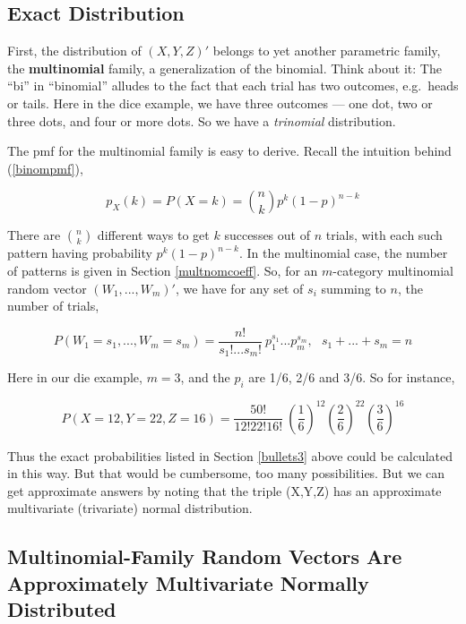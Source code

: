 \subsection{Exact Distribution}

First, the distribution of $(X,Y,Z)'$ belongs to yet another parametric
family, the {\bf multinomial} family, a generalization of the binomial.
Think about it:  The ``bi'' in ``binomial'' alludes to the fact that
each trial has two outcomes, e.g.\ heads or tails.  Here in the dice
example, we have three outcomes --- one dot, two or three dots, and four
or more dots.  So we have a {\it trinomial} distribution.  

The pmf for the multinomial family is easy to derive.  Recall the
intuition behind (\ref{binompmf}),

\begin{equation}
p_X(k) = P(X = k) = \binom{n}{k} p^k (1-p)^{n-k}  
\end{equation}

There are $\binom{n}{k}$ different ways to get $k$ successes out of $n$
trials, with each such pattern having probability $p^k (1-p)^{n-k}$.
In the multinomial case, the number of patterns is given in Section
\ref{multnomcoeff}.  So, for an $m$-category multinomial random vector
$(W_1,...,W_m)'$, we have for any set of $s_i$ summing to $n$, the
number of trials,

\begin{equation}
P(W_1=s_1,...,W_m=s_m) =
\frac{n!}{s_1!...s_m!} ~ p_1^{s_1} ... p_m^{s_m},
~~~ s_1+...+s_m = n 
\end{equation}

Here in our die example, $m = 3$, and the $p_i$ are 1/6, 2/6 and 3/6.
So for instance, 

\begin{equation}
P(X = 12, Y = 22, Z = 16) =
\frac{50!}{12! 22! 16!} ~ 
(\frac{1}{6})^{12}
(\frac{2}{6})^{22}
(\frac{3}{6})^{16}
\end{equation}

Thus the exact probabilities listed in Section \ref{bullets3} above could be calculated in this way.  But that would be cumbersome, too many possibilities.  But we can get approximate answers by noting that the triple (X,Y,Z) has an approximate multivariate (trivariate) normal distribution.  

\subsection{Multinomial-Family Random Vectors Are Approximately
Multivariate Normally Distributed}


